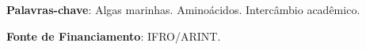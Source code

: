 \documentclass[article,12pt,onesidea,4paper,english,brazil]{abntex2}
\begin{document}
	\vspace{\onelineskip}
	
	\noindent
	\textbf{Palavras-chave}: Algas marinhas. Aminoácidos. Intercâmbio acadêmico.
	 
	 \vspace{\onelineskip}
	 
	 \noindent
	 \textbf{Fonte de Financiamento}: IFRO/ARINT.
\end{document}
